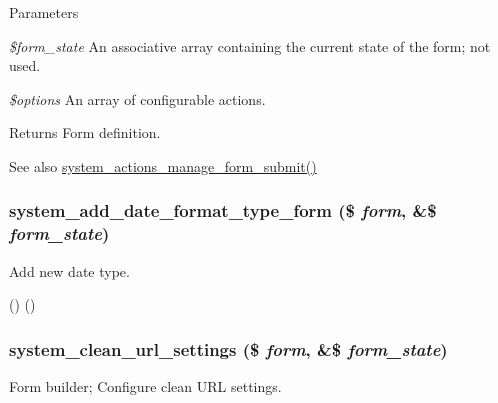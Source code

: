 \begin{DoxyParams}{Parameters}
\item[{\em \$form\_\-state}]An associative array containing the current state of the form; not used. \item[{\em \$options}]An array of configurable actions. \end{DoxyParams}
\begin{DoxyReturn}{Returns}
Form definition.
\end{DoxyReturn}
\begin{DoxySeeAlso}{See also}
\hyperlink{system_8admin_8inc_ab37cd97a32a3723e9af59094d1141951}{system\_\-actions\_\-manage\_\-form\_\-submit()} 
\end{DoxySeeAlso}
\hypertarget{group__forms_ga2f9c33d6203fb7a610b47158e62ed440}{
\subsubsection[{system\_\-add\_\-date\_\-format\_\-type\_\-form}]{\setlength{\rightskip}{0pt plus 5cm}system\_\-add\_\-date\_\-format\_\-type\_\-form (\$ {\em form}, \/  \&\$ {\em form\_\-state})}}
\label{group__forms_ga2f9c33d6203fb7a610b47158e62ed440}
Add new date type.

() () \hypertarget{group__forms_gacdd318d2c081ec1abcbc496e1c4c06dc}{
\subsubsection[{system\_\-clean\_\-url\_\-settings}]{\setlength{\rightskip}{0pt plus 5cm}system\_\-clean\_\-url\_\-settings (\$ {\em form}, \/  \&\$ {\em form\_\-state})}}
\label{group__forms_gacdd318d2c081ec1abcbc496e1c4c06dc}
Form builder; Configure clean URL settings.

